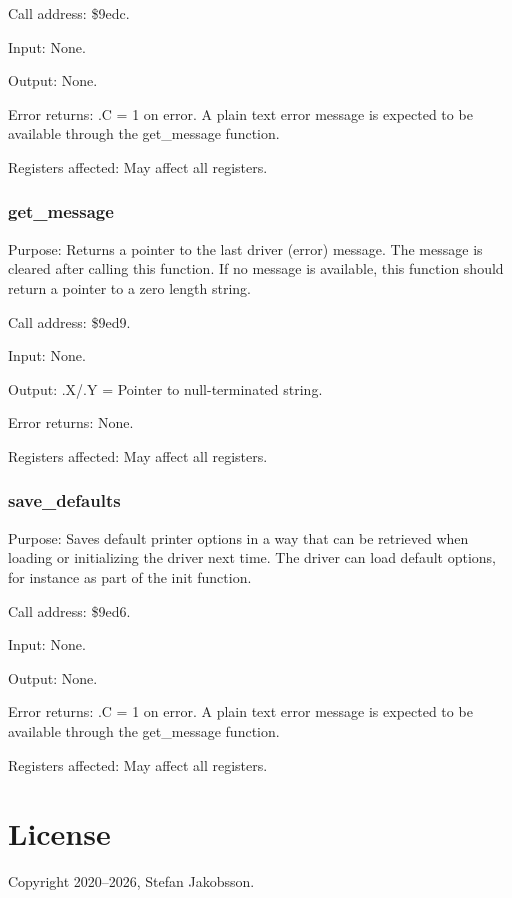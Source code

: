\documentclass{article}
\begin{document}
            Call address: \$9edc.

            Input: None.

            Output: None.

            Error returns: .C = 1 on error. A plain text error message is expected
            to be available through the get\_message function.

            Registers affected: May affect all registers.

        \subsubsection{get\_message}
            Purpose: Returns a pointer to the last driver (error) message. The
            message is cleared after calling this function. If no message is
            available, this function should return a pointer to  a zero 
            length string.

            Call address: \$9ed9.

            Input: None.

            Output: .X/.Y = Pointer to null-terminated string.

            Error returns: None.

            Registers affected: May affect all registers.

        \subsubsection{save\_defaults}
            Purpose: Saves default printer options in a way that can be
            retrieved when loading or initializing the driver next time.
            The driver can load default options, for instance as part
            of the init function.

            Call address: \$9ed6.

            Input: None.

            Output: None.

            Error returns: .C = 1 on error. A plain text error message is expected
            to be available through the get\_message function.

            Registers affected: May affect all registers.

\newpage 
\section{License}
	Copyright 2020--2026, Stefan Jakobsson.
\end{document}
